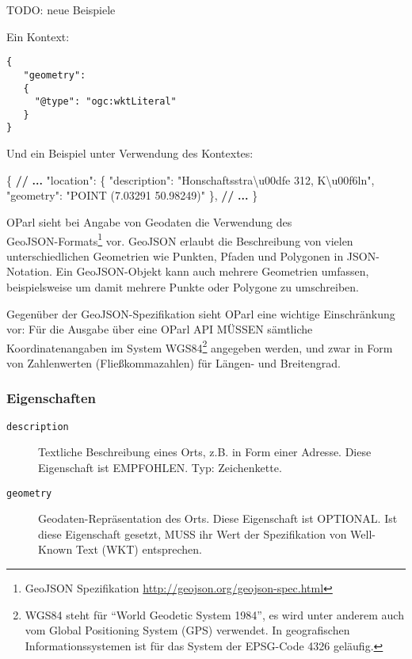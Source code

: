 \documentclass[,a4paper]{article}
\newenvironment{Shaded}{}{}
\newcommand{\DataTypeTok}[1]{\textcolor[rgb]{0.56,0.13,0.00}{{#1}}}
\newcommand{\StringTok}[1]{\textcolor[rgb]{0.25,0.44,0.63}{{#1}}}
\newcommand{\ErrorTok}[1]{\textcolor[rgb]{1.00,0.00,0.00}{\textbf{{#1}}}}
\newcommand{\NormalTok}[1]{{#1}}
\begin{document}
TODO: neue Beispiele

Ein Kontext:

\begin{verbatim}
{
   "geometry":
   {
     "@type": "ogc:wktLiteral" 
   }
}
\end{verbatim}

Und ein Beispiel unter Verwendung des Kontextes:

\begin{Shaded}
\begin{Highlighting}[]
\NormalTok{\{}
    \ErrorTok{//} \ErrorTok{...}
    \DataTypeTok{"location"}\NormalTok{: \{}
        \DataTypeTok{"description"}\NormalTok{: }\StringTok{"Honschaftsstra\textbackslash{}u00dfe 312, K\textbackslash{}u00f6ln"}\NormalTok{,}
        \DataTypeTok{"geometry"}\NormalTok{: }\StringTok{"POINT (7.03291 50.98249)"}
    \NormalTok{\},}
    \ErrorTok{//} \ErrorTok{...}
\NormalTok{\}}
\end{Highlighting}
\end{Shaded}

OParl sieht bei Angabe von Geodaten die Verwendung
des\\GeoJSON-Formats\footnote{GeoJSON Spezifikation
  \url{http://geojson.org/geojson-spec.html}} vor. GeoJSON erlaubt die
Beschreibung von vielen unterschiedlichen Geometrien wie Punkten, Pfaden
und Polygonen in JSON-Notation. Ein GeoJSON-Objekt kann auch mehrere
Geometrien umfassen, beispielsweise um damit mehrere Punkte oder
Polygone zu umschreiben.

Gegenüber der GeoJSON-Spezifikation sieht OParl eine wichtige
Einschränkung vor: Für die Ausgabe über eine OParl API MÜSSEN sämtliche
Koordinatenangaben im System WGS84\footnote{WGS84 steht für ``World
  Geodetic System 1984'', es wird unter anderem auch vom Global
  Positioning System (GPS) verwendet. In geografischen
  Informationssystemen ist für das System der EPSG-Code 4326 geläufig.}
angegeben werden, und zwar in Form von Zahlenwerten (Fließkommazahlen)
für Längen- und Breitengrad.

\subsubsection{Eigenschaften}\label{eigenschaften-8}

\begin{description}
\item[\texttt{description}]
Textliche Beschreibung eines Orts, z.B. in Form einer Adresse. Diese
Eigenschaft ist EMPFOHLEN. Typ: Zeichenkette.
\item[\texttt{geometry}]
Geodaten-Repräsentation des Orts. Diese Eigenschaft ist OPTIONAL. Ist
diese Eigenschaft gesetzt, MUSS ihr Wert der Spezifikation von
Well-Known Text (WKT) entsprechen.
\end{description}
\end{document}
